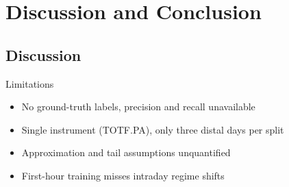 \documentclass{beamer}
\begin{document}
\section{Discussion and Conclusion}
\subsection{Discussion}

\begin{frame}{Limitations}
    \begin{itemize}
        \item No ground-truth labels, precision and recall unavailable
        \item Single instrument (TOTF.PA), only three distal days per split
        \item Approximation and tail assumptions unquantified
        \item First-hour training misses intraday regime shifts
    \end{itemize}
\end{frame}
\end{document}
